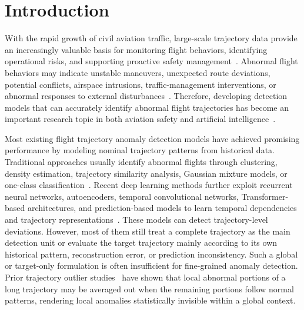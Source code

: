 \documentclass[iicol,pdflatex,sn-basic,Numbered]{sn-jnl}%
\theoremstyle{thmstyleone}%
\theoremstyle{thmstyletwo}%
\theoremstyle{thmstylethree}%
\begin{document}

\maketitle

\section{Introduction}\label{sec:introduction}
With the rapid growth of civil aviation traffic, large-scale trajectory data provide an increasingly valuable basis for monitoring flight behaviors, identifying operational risks, and supporting proactive safety management~\cite{aerospace6110117}. 
Abnormal flight behaviors may indicate unstable maneuvers, unexpected route deviations, potential conflicts, airspace intrusions, traffic-management interventions, or abnormal responses to external disturbances~\cite{app12031295}. 
Therefore, developing detection models that can accurately identify abnormal flight trajectories has become an important research topic in both aviation safety and artificial intelligence~\cite{aerospace13030209,coelho2023analytics}.

Most existing flight trajectory anomaly detection models have achieved promising performance by modeling nominal trajectory patterns from historical data. 
Traditional approaches usually identify abnormal flights through clustering, density estimation, trajectory similarity analysis, Gaussian mixture models, or one-class classification~\cite{li2016gmm,diciccio2016detecting,olive:hal-02345597,9639966,olive2020significant,zhao2021incremental}. 
Recent deep learning methods further exploit recurrent neural networks, autoencoders, temporal convolutional networks, Transformer-based architectures, and prediction-based models to learn temporal dependencies and trajectory representations~\cite{doi:10.2514/1.I010941,chevrot2022cae,LUO2024103840,HUANG2025103478}. 
These models can detect trajectory-level deviations. 
However, most of them still treat a complete trajectory as the main detection unit or evaluate the target trajectory mainly according to its own historical pattern, reconstruction error, or prediction inconsistency. 
Such a global or target-only formulation is often insufficient for fine-grained anomaly detection. 
Prior trajectory outlier studies~\cite{lee2008trajectory,yang2013trasmil,andrienko2018clustering} have shown that local abnormal portions of a long trajectory may be averaged out when the remaining portions follow normal patterns, rendering local anomalies statistically invisible within a global context.
\end{document}
